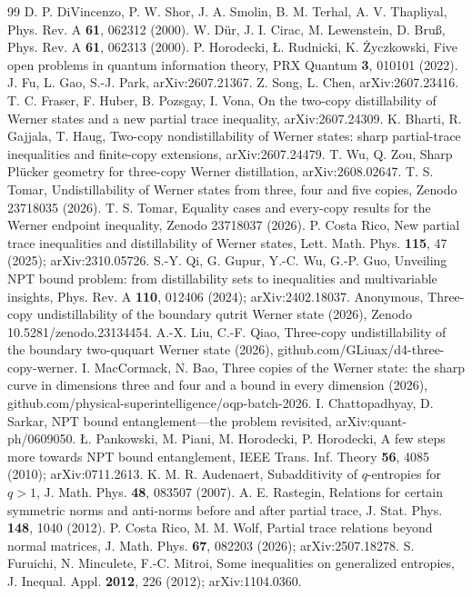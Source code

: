 \documentclass[11pt]{article}
\theoremstyle{remark}
\begin{document}
\begin{thebibliography}{99}
 D. P. DiVincenzo, P. W. Shor, J. A. Smolin, B. M. Terhal, A. V. Thapliyal, Phys. Rev. A \textbf{61}, 062312 (2000).
 W. D\"ur, J. I. Cirac, M. Lewenstein, D. Bru\ss, Phys. Rev. A \textbf{61}, 062313 (2000).
 P. Horodecki, \L. Rudnicki, K. \.Zyczkowski, Five open problems in quantum information theory, PRX Quantum \textbf{3}, 010101 (2022).
 J. Fu, L. Gao, S.-J. Park, arXiv:2607.21367.
 Z. Song, L. Chen, arXiv:2607.23416.
 T. C. Fraser, F. Huber, B. Pozsgay, I. Vona, On the two-copy distillability of Werner states and a new partial trace inequality, arXiv:2607.24309.
 K. Bharti, R. Gajjala, T. Haug, Two-copy nondistillability of Werner states: sharp partial-trace inequalities and finite-copy extensions, arXiv:2607.24479.
 T. Wu, Q. Zou, Sharp Pl\"ucker geometry for three-copy Werner distillation, arXiv:2608.02647.
 T. S. Tomar, Undistillability of Werner states from three, four and five copies, Zenodo 23718035 (2026).
 T. S. Tomar, Equality cases and every-copy results for the Werner endpoint inequality, Zenodo 23718037 (2026).
 P. Costa Rico, New partial trace inequalities and distillability of Werner states, Lett. Math. Phys. \textbf{115}, 47 (2025); arXiv:2310.05726.
 S.-Y. Qi, G. Gupur, Y.-C. Wu, G.-P. Guo, Unveiling NPT bound problem: from distillability sets to inequalities and multivariable insights, Phys. Rev. A \textbf{110}, 012406 (2024); arXiv:2402.18037.
 Anonymous, Three-copy undistillability of the boundary qutrit Werner state (2026), Zenodo 10.5281/zenodo.23134454.
 A.-X. Liu, C.-F. Qiao, Three-copy undistillability of the boundary two-ququart Werner state (2026), github.com/GLiuax/d4-three-copy-werner.
 I. MacCormack, N. Bao, Three copies of the Werner state: the sharp curve in dimensions three and four and a bound in every dimension (2026), github.com/physical-superintelligence/oqp-batch-2026.
 I. Chattopadhyay, D. Sarkar, NPT bound entanglement---the problem revisited, arXiv:quant-ph/0609050.
 \L. Pankowski, M. Piani, M. Horodecki, P. Horodecki, A few steps more towards NPT bound entanglement, IEEE Trans. Inf. Theory \textbf{56}, 4085 (2010); arXiv:0711.2613.
 K. M. R. Audenaert, Subadditivity of $q$-entropies for $q>1$, J. Math. Phys. \textbf{48}, 083507 (2007).
 A. E. Rastegin, Relations for certain symmetric norms and anti-norms before and after partial trace, J. Stat. Phys. \textbf{148}, 1040 (2012).
 P. Costa Rico, M. M. Wolf, Partial trace relations beyond normal matrices, J. Math. Phys. \textbf{67}, 082203 (2026); arXiv:2507.18278.
 S. Furuichi, N. Minculete, F.-C. Mitroi, Some inequalities on generalized entropies, J. Inequal. Appl. \textbf{2012}, 226 (2012); arXiv:1104.0360.
\end{thebibliography}
\end{document}
